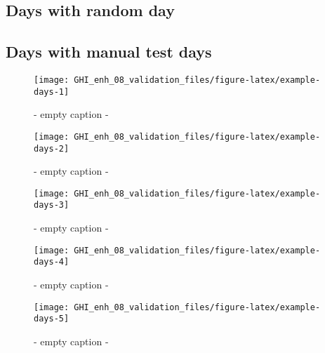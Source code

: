 \documentclass[
  10pt,
  a4paper,oneside]{article}
\begin{document}
\subsection{Days with random day}\label{days-with-random-day}

\FloatBarrier

\subsection{Days with manual test days}\label{days-with-manual-test-days}

\begin{figure}[H]

{\centering \texttt{[image: GHI\_enh\_08\_validation\_files/figure-latex/example-days-1]} 

}

\caption{ - empty caption - }\label{fig:example-days-1}
\end{figure}

\begin{figure}[H]

{\centering \texttt{[image: GHI\_enh\_08\_validation\_files/figure-latex/example-days-2]} 

}

\caption{ - empty caption - }\label{fig:example-days-2}
\end{figure}

\begin{figure}[H]

{\centering \texttt{[image: GHI\_enh\_08\_validation\_files/figure-latex/example-days-3]} 

}

\caption{ - empty caption - }\label{fig:example-days-3}
\end{figure}

\begin{figure}[H]

{\centering \texttt{[image: GHI\_enh\_08\_validation\_files/figure-latex/example-days-4]} 

}

\caption{ - empty caption - }\label{fig:example-days-4}
\end{figure}

\begin{figure}[H]

{\centering \texttt{[image: GHI\_enh\_08\_validation\_files/figure-latex/example-days-5]} 

}

\caption{ - empty caption - }\label{fig:example-days-5}
\end{figure}
\end{document}
